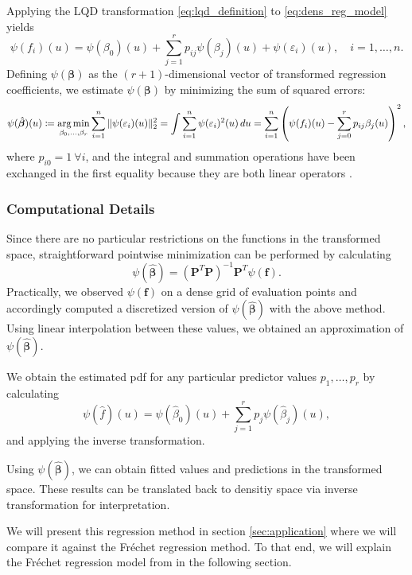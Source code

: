 Applying the LQD transformation \eqref{eq:lqd_definition} to \eqref{eq:dens_reg_model}
yields
\begin{equation}
    \label{eq:lqd_reg_model}
    \psi(f_i)(u) = \psi(\beta_0)(u) + \sum_{j=1}^{r} p_{ij} \psi(\beta_j)(u) + \psi(\varepsilon_i)(u), \quad i = 1, \ldots, n.
\end{equation}
Defining $\psi(\boldsymbol{\beta})$ as the $(r+1)$-dimensional vector of transformed
regression coefficients, we estimate $\psi(\boldsymbol{\beta})$ by minimizing the sum of
squared errors:
\begin{equation}
    \psi(\hat{\boldsymbol{\beta}})(u)
    \coloneqq \operatorname*{arg\,min}_{\beta_0,\dots, \beta_r} \sum_{i=1}^{n} \|\psi(\varepsilon_i) (u)\|_2^2
    = \int \sum_{i=1}^{n} \psi(\varepsilon_i)^2 (u) \, du
    = \sum_{i=1}^{n} \left( \psi(f_i)(u) - \sum_{j=0}^{r} p_{ij} \beta_j(u) \right)^2,
\end{equation}
where $p_{i0} = 1 \ \forall i$, and the integral and summation operations have been
exchanged in the first equality because they are both linear operators
\parencites[cf.][Chapter~13.4]{RamsaySilverman2005}[][Chapter~5.1]{KokoszkaReimherr2017}.

\subsubsection{Computational Details}
\label{sec:com_details_func_reg}
Since there are no particular restrictions on the functions in the transformed space,
straightforward pointwise minimization can be performed by calculating
\begin{equation}
    \psi(\hat{\boldsymbol{\beta}})
    = \left(\mathbf{P}^T \mathbf{P}\right)^{-1} \mathbf{P}^T \psi(\mathbf{f}).
\end{equation}
Practically, we observed $\psi(\mathbf{f})$ on a dense grid of evaluation points and
accordingly computed a discretized version of $\psi(\hat{\boldsymbol{\beta}})$ with the
above method. Using linear interpolation between these values, we obtained an approximation
of $\psi(\hat{\boldsymbol{\beta}})$.

We obtain the estimated pdf for any particular predictor values $p_1, \dots, p_r$ by
calculating
\begin{equation}
    \psi(\hat{f})(u)
    = \psi(\hat{\beta}_0)(u) + \sum_{j=1}^{r} p_{j} \psi(\hat{\beta}_j)(u),
\end{equation}
and applying the inverse transformation.

Using $\psi(\hat{\boldsymbol{\beta}})$, we can obtain fitted values and predictions in
the transformed space. These results can be translated back to densitiy space via
inverse transformation for interpretation.

We will present this regression method in section \ref{sec:application} where we will
compare it against the Fréchet regression method. To that end, we will explain the
Fréchet regression model from \textcite{PetersenMüller2019} in the following section.
